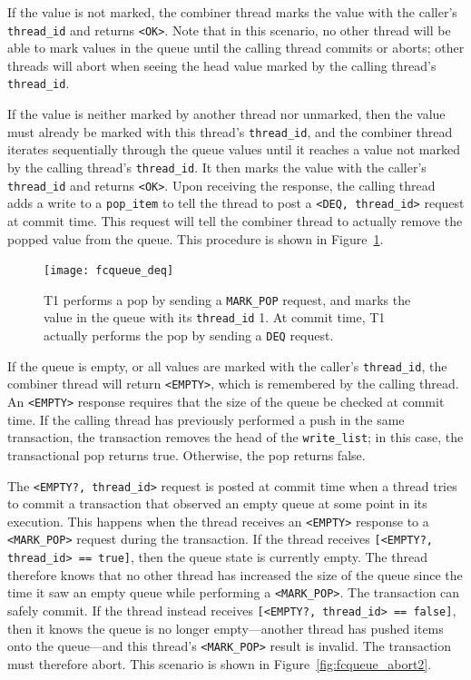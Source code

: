 If the value is not marked, the combiner thread marks the value with the caller's \texttt{thread\_id} and returns \texttt{<OK>}. Note that in this scenario, no other thread will be able to mark values in the queue until the calling thread commits or aborts; other threads will abort when seeing the head value marked by the calling thread's \texttt{thread\_id}. 

If the value is neither marked by another thread nor unmarked, then the value must already be marked with this thread's \texttt{thread\_id}, and the combiner thread iterates sequentially through the queue values until it reaches a value not marked by the calling thread's \texttt{thread\_id}. It then marks the value with the caller's \texttt{thread\_id} and returns \texttt{<OK>}. Upon receiving the response, the calling thread adds a write to a \texttt{pop\_item} to tell the thread to post a \texttt{<DEQ, thread\_id>} request at commit time. This request will tell the combiner thread to actually remove the popped value from the queue. This procedure is shown in Figure~\ref{fig:fcqueue_deq}.

\begin{figure}[t]
\centering
\texttt{[image: fcqueue\_deq]}
    \caption[Transactional flat combining pop request execution]{T1 performs a pop by sending a \texttt{MARK\_POP} request, and marks the value in the queue with its \texttt{thread\_id} 1. At commit time, T1 actually performs the pop by sending a \texttt{DEQ} request.} 
\label{fig:fcqueue_deq}
\end{figure}

If the queue is empty, or all values are marked with the caller's \texttt{thread\_id}, the combiner thread will return \texttt{<EMPTY>}, which is remembered by the calling thread. An \texttt{<EMPTY>} response requires that the size of the queue be checked at commit time. If the calling thread has previously performed a push in the same transaction, the transaction removes the head of the \texttt{write\_list}; in this case, the transactional pop returns true. Otherwise, the pop returns false.

The \texttt{<EMPTY?, thread\_id>} request is posted at commit time when a thread tries to commit a transaction that observed an empty queue at some point in its execution. This happens when the thread receives an \texttt{<EMPTY>} response to a \texttt{<MARK\_POP>} request during the transaction. If the thread receives \texttt{[<EMPTY?, thread\_id> == true]}, then the queue state is currently empty.
The thread therefore knows that no other thread has increased the size of the queue since the time it saw an empty queue while performing a \texttt{<MARK\_POP>}. The transaction can safely commit. If the thread instead receives \texttt{[<EMPTY?, thread\_id> == false]}, then it knows the queue is no longer empty---another thread has pushed items onto the queue---and this thread's \texttt{<MARK\_POP>} result is invalid. The transaction must therefore abort. This scenario is shown in Figure~\ref{fig:fcqueue_abort2}.

